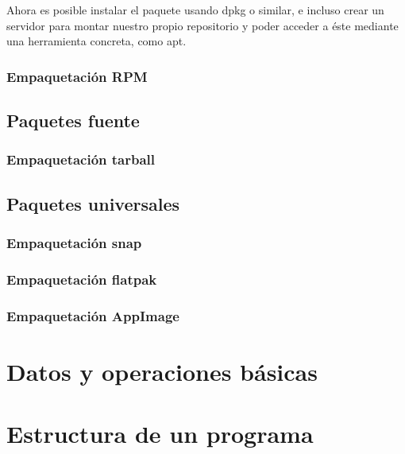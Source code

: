 \documentclass[a4paper, 11pt, titlepage]{article}
\begin{document}
            Ahora es posible instalar el paquete usando dpkg o similar, e incluso crear un servidor para 
            montar nuestro propio repositorio y poder acceder a éste mediante una herramienta concreta, como 
            apt.

        \subsubsection{Empaquetación RPM}

    \subsection{Paquetes fuente}

        \subsubsection{Empaquetación tarball}

    \subsection{Paquetes universales}

        \subsubsection{Empaquetación snap}

        \subsubsection{Empaquetación flatpak}

        \subsubsection{Empaquetación AppImage}
            

\section{Datos y operaciones básicas}


\section{Estructura de un programa}
\end{document}
